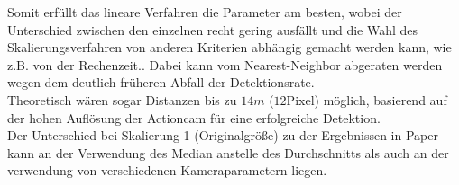 Somit erfüllt das lineare Verfahren die Parameter am besten, wobei der Unterschied zwischen den einzelnen recht gering ausfällt und die Wahl des Skalierungsverfahren von anderen Kriterien abhängig gemacht werden kann, wie z.B. von der Rechenzeit.. Dabei kann vom Nearest-Neighbor abgeraten werden wegen dem deutlich früheren Abfall der Detektionsrate.\\
Theoretisch wären sogar Distanzen bis zu $14m$ ($12$Pixel) möglich, basierend auf der hohen Auflösung der Actioncam für eine erfolgreiche Detektion.\\
Der Unterschied bei Skalierung 1 (Originalgröße) zu der Ergebnissen in Paper \cite{OpenFace} kann an der Verwendung des Median anstelle des Durchschnitts als auch an der verwendung von verschiedenen Kameraparametern liegen.